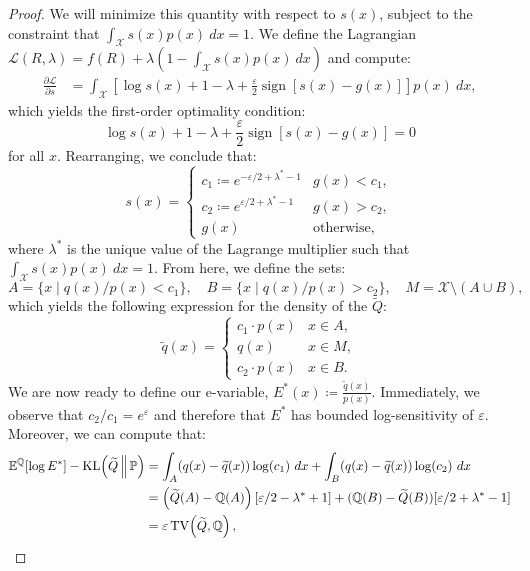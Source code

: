 \documentclass{article}
\DeclareMathOperator{\KLop}{KL}
\newcommand{\KL}[2]{%
  \mathchoice
    {\KLop\!\left(#1\,\middle\|\,#2\right)}%
    {\KLop(#1\,\Vert\,#2)}%
    {\KLop(#1\,\Vert\,#2)}%
    {\KLop(#1\,\Vert\,#2)}%
}
\DeclareMathOperator{\TVop}{TV}
\newcommand{\TV}[2]{
  \mathchoice
    {\TVop\!\left(#1,#2\right)}%
    {\TVop(#1,#2)}%
    {\TVop(#1,#2)}%
    {\TVop(#1,#2)}%
}
\newcommand{\Null}{\mathbb{P}}
\newcommand{\E}{\mathbb{E}}
\newcommand{\Alt}{\mathbb{Q}}
\newcommand{\eps}{\varepsilon}
\DeclareMathOperator{\sign}{sign}
\begin{document}
\begin{proof}
    We will minimize this quantity with respect to $s(x)$, subject to the constraint that $\int_\mathcal{X}s(x)p(x)~dx = 1$. We define the Lagrangian $\mathcal{L}(R,\lambda) = f(R) + \lambda (1-\int_{\mathcal{X}} s(x)p(x)~dx)$ and compute:
    \begin{align*}
        \frac{\partial \mathcal{L}}{\partial s}
        &= \int_\mathcal{X} \left[\log s(x) + 1 - \lambda + \frac{\eps}{2} \sign[s(x)-g(x)] \right]p(x)~dx,
    \end{align*}
    which yields the first-order optimality condition:
    \begin{equation*}
        \log s(x) + 1 - \lambda + \frac{\eps}{2} \sign[s(x)-g(x)] = 0
    \end{equation*}
    for all $x$. Rearranging, we conclude that:
    \begin{equation*}
        s(x) = \begin{cases}
            c_1 \coloneq e^{-\eps/2 + \lambda^* - 1} & g(x) < c_1, \\
            c_2 \coloneq e^{\eps/2+\lambda^*-1} & g(x) > c_2, \\
            g(x) & \text{otherwise},
        \end{cases}
    \end{equation*}
    where $\lambda^*$ is the unique value of the Lagrange multiplier such that $\int_{\mathcal{X}} s(x)p(x)~dx = 1$. From here, we define the sets:
    \begin{equation*}
        A = \lbrace x \mid q(x)/p(x) < c_1\rbrace,\quad B = \lbrace x \mid q(x)/p(x) > c_2\rbrace, \quad M = \mathcal{X} \setminus(A \cup B),
    \end{equation*}
    which yields the following expression for the density of the $\widetilde Q$:
    \begin{equation*}
        \widetilde q(x) = \begin{cases}
            c_1\cdot p(x) & x \in A, \\
            q(x) & x \in M, \\
            c_2 \cdot p(x) & x \in B.
        \end{cases}
    \end{equation*}
    We are now ready to define our e-variable, $E^*(x) \coloneq \frac{\widetilde q(x)}{p(x)}$. Immediately, we observe that $c_2/c_1 = e^\varepsilon$ and therefore that $E^*$ has bounded log-sensitivity of $\eps$. Moreover, we can compute that:
    \begin{align*}
        \E^\Alt[\log E^*] - \KL{\widetilde Q}{\Null}
        &= \int_A (q(x) - \widetilde q(x)) \log(c_1)~dx + \int_B (q(x) - \widetilde q(x)) \log(c_2)~dx \\
        &= \left( \widetilde Q(A) - \Alt(A)  \right)[\eps/2 - \lambda^* + 1] + (\Alt(B) - \widetilde Q(B))[\eps/2 + \lambda^* - 1] \\
        &= \eps \TV{\widetilde Q}{\Alt},
    \end{align*}


\end{proof}
\end{document}
